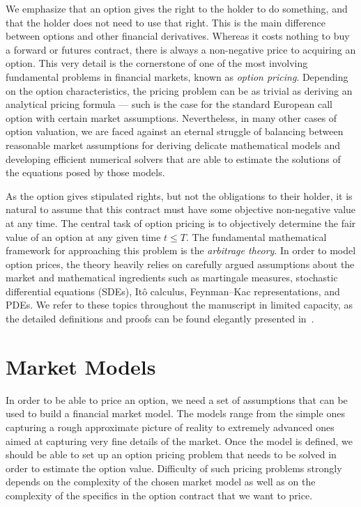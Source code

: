 \documentclass{UUThesisTemplate}
\begin{document}
\par
We emphasize that an option gives the right to the holder to do something, and that the holder does not need to use that right. This is the main difference between options and other financial derivatives. Whereas it costs nothing to buy a forward or futures contract, there is always a non-negative price to acquiring an option. This very detail is the cornerstone of one of the most involving fundamental problems in financial markets, known as \emph{option pricing}. Depending on the option characteristics, the pricing problem can be as trivial as deriving an analytical pricing formula --- such is the case for the standard European call option with certain market assumptions. Nevertheless, in many other cases of option valuation, we are faced against an eternal struggle of balancing between reasonable market assumptions for deriving delicate mathematical models and developing efficient numerical solvers that are able to estimate the solutions of the equations posed by those models.

\par
As the option gives stipulated rights, but not the obligations to their holder, it is natural to assume that this contract must have some objective non-negative value at any time. The central task of option pricing is to objectively determine the fair value of an option at any given time $t \leq T$. The fundamental mathematical framework for approaching this problem is the \emph{arbitrage theory}. In order to model option prices, the theory heavily relies on carefully argued assumptions about the market and mathematical ingredients such as martingale measures, stochastic differential equations (SDEs), It\^o calculus, Feynman--Kac representations, and PDEs. We refer to these topics throughout the manuscript in limited capacity, as the detailed definitions and proofs can be found elegantly presented in~\cite{bjork2009arbitrage}.
%





%
\section{Market Models}
\label{sec:models}
\par
In order to be able to price an option, we need a set of assumptions that can be used to build a financial market model. The models range from the simple ones capturing a rough approximate picture of reality to extremely advanced ones aimed at capturing very fine details of the market. Once the model is defined, we should be able to set up an option pricing problem that needs to be solved in order to estimate the option value. Difficulty of such pricing problems strongly depends on the complexity of the chosen market model as well as on the complexity of the specifics in the option contract that we want to price.  
%
\end{document}
